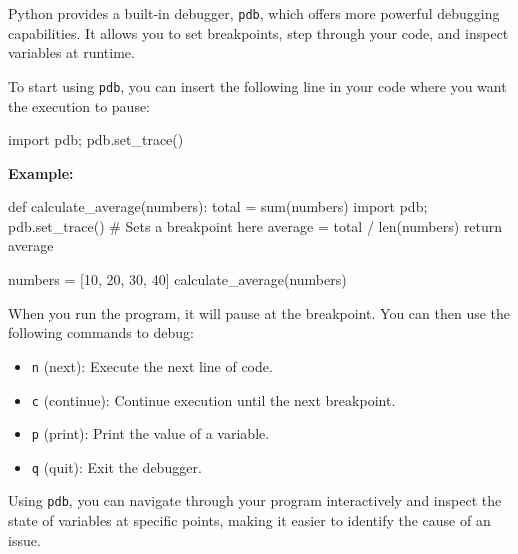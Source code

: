 \documentclass[
  letterpaper,
  DIV=11,
  numbers=noendperiod]{scrreprt}
\newenvironment{Shaded}{\begin{snugshade}}{\end{snugshade}}
\newcommand{\BuiltInTok}[1]{\textcolor[rgb]{0.00,0.23,0.31}{#1}}
\newcommand{\CommentTok}[1]{\textcolor[rgb]{0.37,0.37,0.37}{#1}}
\newcommand{\ControlFlowTok}[1]{\textcolor[rgb]{0.00,0.23,0.31}{#1}}
\newcommand{\DecValTok}[1]{\textcolor[rgb]{0.68,0.00,0.00}{#1}}
\newcommand{\ImportTok}[1]{\textcolor[rgb]{0.00,0.46,0.62}{#1}}
\newcommand{\KeywordTok}[1]{\textcolor[rgb]{0.00,0.23,0.31}{#1}}
\newcommand{\NormalTok}[1]{\textcolor[rgb]{0.00,0.23,0.31}{#1}}
\newcommand{\OperatorTok}[1]{\textcolor[rgb]{0.37,0.37,0.37}{#1}}
\providecommand{\tightlist}{%
  \setlength{\itemsep}{0pt}\setlength{\parskip}{0pt}}\usepackage{longtable,booktabs,array}
\begin{document}
Python provides a built-in debugger, \texttt{pdb}, which offers more
powerful debugging capabilities. It allows you to set breakpoints, step
through your code, and inspect variables at runtime.

To start using \texttt{pdb}, you can insert the following line in your
code where you want the execution to pause:

\begin{Shaded}
\begin{Highlighting}[]
\ImportTok{import}\NormalTok{ pdb}\OperatorTok{;}\NormalTok{ pdb.set\_trace()}
\end{Highlighting}
\end{Shaded}

\textbf{Example:}

\begin{Shaded}
\begin{Highlighting}[]
\KeywordTok{def}\NormalTok{ calculate\_average(numbers):}
\NormalTok{    total }\OperatorTok{=} \BuiltInTok{sum}\NormalTok{(numbers)}
    \ImportTok{import}\NormalTok{ pdb}\OperatorTok{;}\NormalTok{ pdb.set\_trace()  }\CommentTok{\# Sets a breakpoint here}
\NormalTok{    average }\OperatorTok{=}\NormalTok{ total }\OperatorTok{/} \BuiltInTok{len}\NormalTok{(numbers)}
    \ControlFlowTok{return}\NormalTok{ average}

\NormalTok{numbers }\OperatorTok{=}\NormalTok{ [}\DecValTok{10}\NormalTok{, }\DecValTok{20}\NormalTok{, }\DecValTok{30}\NormalTok{, }\DecValTok{40}\NormalTok{]}
\NormalTok{calculate\_average(numbers)}
\end{Highlighting}
\end{Shaded}

When you run the program, it will pause at the breakpoint. You can then
use the following commands to debug:

\begin{itemize}
\tightlist
\item
  \texttt{n} (next): Execute the next line of code.
\item
  \texttt{c} (continue): Continue execution until the next breakpoint.
\item
  \texttt{p} (print): Print the value of a variable.
\item
  \texttt{q} (quit): Exit the debugger.
\end{itemize}

Using \texttt{pdb}, you can navigate through your program interactively
and inspect the state of variables at specific points, making it easier
to identify the cause of an issue.
\end{document}
